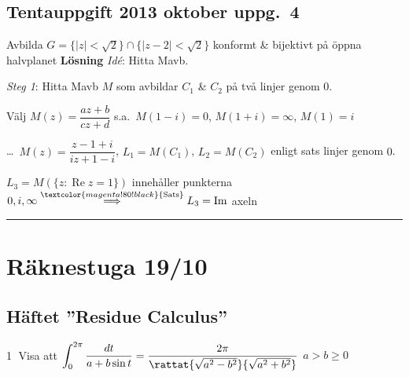 \subsection{Tentauppgift 2013 oktober uppg.\ 4}
Avbilda $G = \{|z| < \sqrt{2}\} \cap \{|z - 2| < \sqrt{2}\}$ konformt \& bijektivt på öppna halvplanet
\textbf{Lösning}
\emph{Idé}: Hitta Mavb.

\emph{Steg 1}: Hitta Mavb $M$ som avbildar $C_1$ \& $C_2$ på två linjer genom $0$.

Välj $M(z) = \dfrac{az + b}{cz + d}$ s.a.\ $M(1 - i) = 0$, $M(1 + i) = \infty$, $M(1) = i$

\dots\ $M(z) = \dfrac{z - 1 + i}{iz + 1 - i}$, $L_1 = M(C_1)$, $L_2 = M(C_2)$ enligt sats linjer genom $0$.

$L_3 = M(\{z : \operatorname{Re} z = 1\})$ innehåller punkterna $0, i, \infty \overset{\textcolor{magenta!80!black}{\text{Sats}}}{\Longrightarrow} L_3 = \operatorname{Im}$ axeln

\noindent\rule{\linewidth}{0.4pt}

\section{Räknestuga 19/10}
\subsection{Häftet ''Residue Calculus''}
\textcircled{1} Visa att $\displaystyle\int_0^{2\pi} \frac{dt}{a + b\sin t} = \frac{2\pi}{\rattat{\sqrt{a^2 - b^2}}{\sqrt{a^2 + b^2}}}$ \quad $a > b \ge 0$


